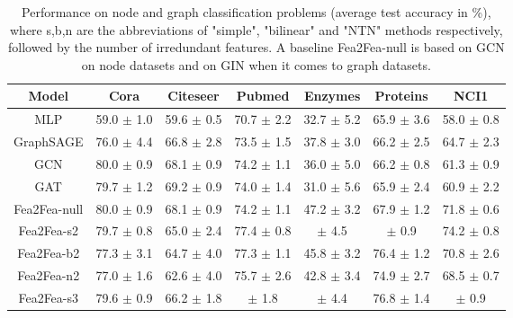\documentclass[runningheads]{llncs}
\newcommand{\B}{\fontseries{b}\selectfont}
\begin{document}
  \begin{table}\scriptsize
    \centering
    \caption{Performance on node and graph classification problems (average test accuracy in \%), where s,b,n are the abbreviations of "simple", "bilinear" and "NTN" methods respectively, followed by the number of irredundant features. A baseline Fea2Fea-null is based on GCN on node datasets and on GIN when it comes to graph datasets.}
    \vspace{-0.3cm}
    \begin{tabular}{*{7}{c}} \toprule
  {Model}  & \multicolumn{1}{c}{{\sc Cora}} & \multicolumn{1}{c}{{\sc Citeseer}} & \multicolumn{1}{c}{{\sc Pubmed}}  & \multicolumn{1}{c}{{\sc Enzymes}} & \multicolumn{1}{c}{{\sc Proteins}}  & \multicolumn{1}{c}{{\sc NCI1}}   \\ \hline



  MLP           & 59.0 $\pm$ 1.0& 59.6 $\pm$ 0.5 & 70.7 $\pm$ 2.2  & 32.7 $\pm$  5.2 & 65.9 $\pm$ 3.6   & 58.0 $\pm$ 0.8   \\
  GraphSAGE       &  76.0 $\pm$ 4.4&  66.8 $\pm$ 2.8 & 73.5 $\pm$ 1.5 & 37.8 $\pm$ 3.0  &  66.2 $\pm$ 2.5  & 64.7 $\pm$ 2.3   \\
  GCN             & 80.0 $\pm$ 0.9 & 68.1 $\pm$ 0.9 & 74.2 $\pm$ 1.1 & 36.0 $\pm$ 5.0  &  66.2 $\pm$ 0.8  & 61.3 $\pm$ 0.9  \\
  GAT             & 79.7 $\pm$ 1.2 & 69.2 $\pm$ 0.9 &  74.0 $\pm$ 1.4 &  31.0 $\pm$ 5.6  &   65.9 $\pm$ 2.4  & 60.9 $\pm$ 2.2 \\          
  Fea2Fea-null    & 80.0 $\pm$ 0.9 & 68.1 $\pm$ 0.9 & 74.2 $\pm$ 1.1 & 47.2 $\pm$ 3.2 & 67.9 $\pm$ 1.2  & 71.8  $\pm$ 0.6 \\ \hline
  Fea2Fea-s2       & 79.7 $\pm$ 0.8 &  65.0 $\pm$ 2.4 & 77.4 $\pm$ 0.8 & \B48.5 $\pm$ 4.5  &\B77.8 $\pm$ 0.9  &  74.2 $\pm$ 0.8       \\
  Fea2Fea-b2   & 77.3 $\pm$  3.1 & 64.7 $\pm$ 4.0 &77.3 $\pm$ 1.1& 45.8 $\pm$ 3.2  & 76.4 $\pm$ 1.2  & 70.8 $\pm$ 2.6\\
  Fea2Fea-n2  & 77.0 $\pm$  1.6 & 62.6 $\pm$ 4.0 & 75.7 $\pm$ 2.6  & 42.8 $\pm$ 3.4 & 74.9 $\pm$ 2.7 & 68.5 $\pm$ 0.7\\
  Fea2Fea-s3       & 79.6 $\pm$ 0.9  &66.2 $\pm$  1.8 & \B78.5 $\pm$ 1.8  &  \B48.0 $\pm$ 4.4  & 76.8 $\pm$ 1.4 & \B74.9 $\pm$ 0.9   \\           \hline

    
  \bottomrule
    \end{tabular}
  \end{table} 
\end{document}
